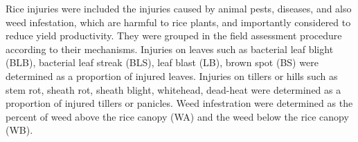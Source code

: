 Rice injuries were included the injuries caused by animal pests, diseases, and also weed infestation, which are harmful to rice plants, and importantly considered to reduce yield productivity. They were grouped in the field assessment procedure according to their mechanisms. Injuries on leaves such as bacterial leaf blight (BLB), bacterial leaf streak (BLS), leaf blast (LB), brown spot (BS) were determined as a proportion of injured leaves. Injuries on tillers or hills such as stem rot, sheath rot, sheath blight, whitehead, dead-heat were determined as a proportion of injured tillers  or panicles.  Weed infestration were determined as the percent of weed above the rice canopy (WA) and the weed below the rice canopy (WB). 
